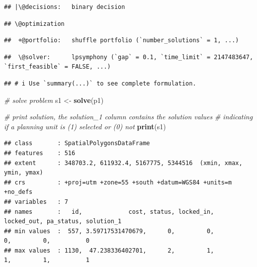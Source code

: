 \documentclass[12pt,]{book}
\newenvironment{Shaded}{\begin{snugshade}}{\end{snugshade}}
\newcommand{\CommentTok}[1]{\textcolor[rgb]{0.56,0.35,0.01}{\textit{#1}}}
\newcommand{\DecValTok}[1]{\textcolor[rgb]{0.00,0.00,0.81}{#1}}
\newcommand{\KeywordTok}[1]{\textcolor[rgb]{0.13,0.29,0.53}{\textbf{#1}}}
\newcommand{\NormalTok}[1]{#1}
\newcommand{\OperatorTok}[1]{\textcolor[rgb]{0.81,0.36,0.00}{\textbf{#1}}}
\newcommand{\StringTok}[1]{\textcolor[rgb]{0.31,0.60,0.02}{#1}}
\begin{document}
\begin{verbatim}
## |\@decisions:   binary decision
\end{verbatim}

\begin{verbatim}
## \@optimization
\end{verbatim}

\begin{verbatim}
##  +@portfolio:   shuffle portfolio (`number_solutions` = 1, ...)
\end{verbatim}

\begin{verbatim}
##  \@solver:      lpsymphony (`gap` = 0.1, `time_limit` = 2147483647, `first_feasible` = FALSE, ...)
\end{verbatim}

\begin{verbatim}
## # i Use `summary(...)` to see complete formulation.
\end{verbatim}

\begin{Shaded}
\begin{Highlighting}[]
\CommentTok{# solve problem}
\NormalTok{s1 <-}\StringTok{ }\KeywordTok{solve}\NormalTok{(p1)}

\CommentTok{# print solution, the solution_1 column contains the solution values}
\CommentTok{# indicating if a planning unit is (1) selected or (0) not}
\KeywordTok{print}\NormalTok{(s1)}
\end{Highlighting}
\end{Shaded}

\begin{verbatim}
## class       : SpatialPolygonsDataFrame 
## features    : 516 
## extent      : 348703.2, 611932.4, 5167775, 5344516  (xmin, xmax, ymin, ymax)
## crs         : +proj=utm +zone=55 +south +datum=WGS84 +units=m +no_defs 
## variables   : 7
## names       :   id,             cost, status, locked_in, locked_out, pa_status, solution_1 
## min values  :  557, 3.59717531470679,      0,         0,          0,         0,          0 
## max values  : 1130,  47.238336402701,      2,         1,          1,         1,          1
\end{verbatim}

\begin{Shaded}
\end{Shaded}
\end{document}
